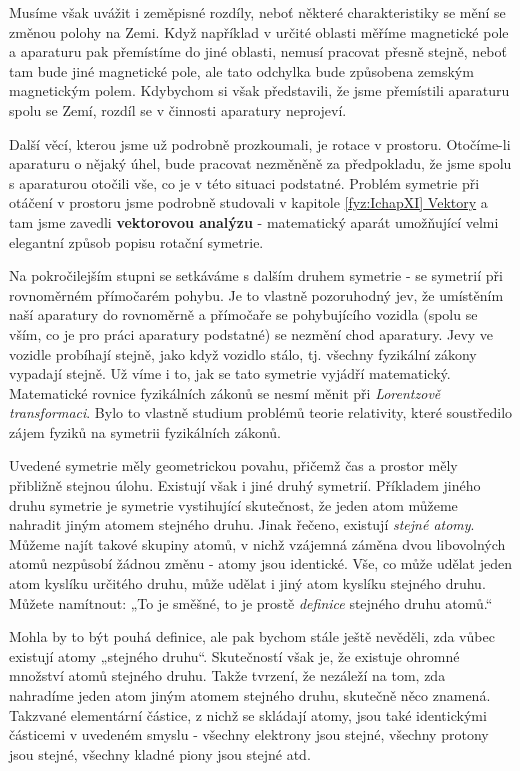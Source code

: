     Musíme však uvážit i zeměpisné rozdíly, neboť některé charakteristiky se mění se změnou polohy
    na Zemi. Když například v určité oblasti měříme magnetické pole a aparaturu pak přemístíme do
    jiné oblasti, nemusí pracovat přesně stejně, neboť tam bude jiné magnetické pole, ale tato
    odchylka bude způsobena zemským magnetickým polem. Kdybychom si však představili, že jsme
    přemístili aparaturu spolu se Zemí, rozdíl se v činnosti aparatury neprojeví.

    Další věcí, kterou jsme už podrobně prozkoumali, je rotace v prostoru. Otočíme-li aparaturu
    o nějaký úhel, bude pracovat nezměněně za předpokladu, že jsme spolu s aparaturou otočili vše,
    co je v této situaci podstatné. Problém symetrie při otáčení v prostoru jsme podrobně studovali
    v kapitole \hyperref[fyz:IchapXI]{\ref*{fyz:IchapXI} Vektory} a tam jsme zavedli
    \textbf{vektorovou analýzu} - matematický aparát umožňující velmi elegantní způsob popisu
    rotační symetrie.

    Na pokročilejším stupni se setkáváme s dalším druhem symetrie - se symetrií při rovnoměrném
    přímočarém pohybu. Je to vlastně pozoruhodný jev, že umístěním naší aparatury do rovnoměrně a
    přímočaře se pohybujícího vozidla (spolu se vším, co je pro práci aparatury podstatné) se
    nezmění chod aparatury. Jevy ve vozidle probíhají stejně, jako když vozidlo stálo, tj. všechny
    fyzikální zákony vypadají stejně. Už víme i to, jak se tato symetrie vyjádří matematický.
    Matematické rovnice fyzikálních zákonů se nesmí měnit při \emph{Lorentzově transformaci}. Bylo
    to vlastně studium problémů teorie relativity, které soustředilo zájem fyziků na symetrii
    fyzikálních zákonů.

    Uvedené symetrie měly geometrickou povahu, přičemž čas a prostor měly přibližně stejnou úlohu.
    Existují však i jiné druhý symetrií. Příkladem jiného druhu symetrie je symetrie vystihující
    skutečnost, že jeden atom můžeme nahradit jiným atomem stejného druhu. Jinak řečeno, existují
    \emph{stejné atomy}. Můžeme najít takové skupiny atomů, v nichž vzájemná záměna dvou libovolných
    atomů nezpůsobí žádnou změnu - atomy jsou identické. Vše, co může udělat jeden atom kyslíku
    určitého druhu, může udělat i jiný atom kyslíku stejného druhu. Můžete namítnout: „To je směšné,
    to je prostě \emph{deﬁnice} stejného druhu atomů.“

    Mohla by to být pouhá deﬁnice, ale pak bychom stále ještě nevěděli, zda vůbec existují atomy
    „stejného druhu“. Skutečností však je, že existuje ohromné množství atomů stejného druhu. Takže
    tvrzení, že nezáleží na tom, zda nahradíme jeden atom jiným atomem stejného druhu, skutečně něco
    znamená. Takzvané elementární částice, z nichž se skládají atomy, jsou také identickými
    částicemi v uvedeném smyslu - všechny elektrony jsou stejné, všechny protony jsou stejné,
    všechny kladné piony jsou stejné atd.

